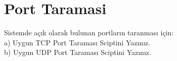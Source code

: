 

% 

% 


\section{Port Taramasi}

\begin{question}
Sistemde açık olarak bulunan portların taranması için:
	\\ a) Uygun TCP Port Taraması Sciptini Yazınız.
	\\ b) Uygun UDP Port Taraması Sciptini Yazınız. 
\end{question}






% 



